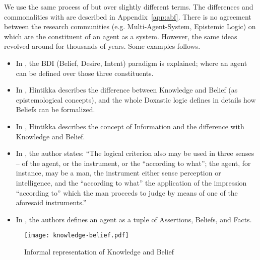 We use the same process of \autocite{Santaca2016abf} but over slightly different
terms. The differences and commonalities with \autocite{Santaca2016abf} 
are described in Appendix~\ref{app:abf}. There is no 
agreement between the research communities (e.g. Multi-Agent-System, Epistemic Logic)
on which are the constituent of an agent as a system. However,
the same ideas revolved around for thousands of years. Some examples
follows.
\begin{itemize}
	\item In \autocite{Georgeoff1995bdi}, the BDI (Belief, Desire, Intent)
		paradigm is explained; where an agent can be defined over those
		three constituents.
	\item In \autocite{Hintikka1962knwoledge}, Hintikka describes the
		difference between Knowledge and Belief (as epistemological
		concepts), and the whole Doxastic logic defines in details how
		Beliefs can be formalized.
	\item In \autocite{Hintikka1993Information}, Hintikka describes the concept
		of Information and the difference with Knowledge and Belief.
	\item In \autocite{Empiricus1990Pyrrhonism}, the author states: ``The
		logical criterion also may be used in three senses -- of the
		agent, or the instrument, or the ``according to what''; the
		agent, for instance, may be a man, the instrument either sense
		perception or intelligence, and the ``according to what'' the
		application of the impression ``according to'' which the man
		proceeds to judge by means of one of the aforesaid
		instruments.'' 
	\item In \autocite{Santaca2016abf}, the authors defines an agent as a
		tuple of Assertions, Beliefs, and Facts.
\end{itemize}


\begin{figure}[t]
	\centering
	\texttt{[image: knowledge-belief.pdf]}
	\caption{Informal representation of Knowledge and Belief}
	\label{fig:knowledge-belief}
\end{figure}

